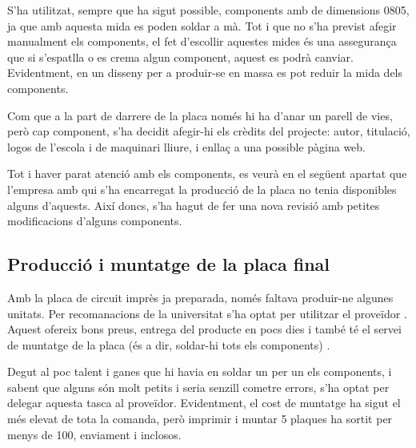 S'ha utilitzat,
sempre que ha sigut possible, components amb  de dimensions 0805,
ja que amb aquesta mida es poden soldar a mà. Tot i que no s'ha previst afegir
manualment els components, el fet d'escollir aquestes mides és una assegurança
que si s'espatlla o es crema algun component, aquest es podrà canviar.
Evidentment, en un disseny per a produir-se en massa es pot reduir la mida dels
components.

Com que a la part de darrere de la placa només hi ha d'anar un parell de vies,
però cap component, s'ha decidit afegir-hi els crèdits del projecte: autor,
titulació, logos de l'escola i de maquinari lliure, i enllaç a una possible
pàgina web.

Tot i haver parat atenció amb els components, es veurà en el següent apartat que
l'empresa amb qui s'ha encarregat la producció de la placa no tenia disponibles
alguns d'aquests. Així doncs, s'ha hagut de fer una nova revisió amb petites
modificacions d'alguns components.

\subsection{Producció i muntatge de la placa final}

Amb la placa de circuit imprès ja preparada, només faltava produir-ne algunes
unitats. Per recomanacions de la universitat s'ha optat per utilitzar el
proveïdor . Aquest ofereix bons preus, entrega del producte en pocs
dies i també té el servei de muntatge de la placa (és a dir, soldar-hi tots els
components) \cite{JlcPcb}.

Degut al poc talent i ganes que hi havia en soldar un per un els components, i
sabent que alguns són molt petits i seria senzill cometre errors, s'ha optat
per delegar aquesta tasca al proveïdor. Evidentment, el cost de muntatge ha
sigut el més elevat de tota la comanda, però imprimir i muntar 5 plaques
ha sortit per menys de \SI[round-mode=places,round-precision=0]{100}{\EUR},
enviament i  inclosos.

